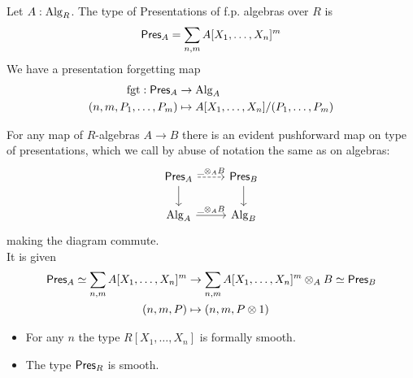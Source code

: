 \begin{definition}
	Let $A : \operatorname{Alg}_R$.
	 The type of Presentations of f.p. algebras over $R$ is 
	\[
	\mathsf{Pres}_A = \sum_{n,m} A[X_1,\hdots,X_n]^m
	\]
	We have a presentation forgetting map 
	\begin{align*}
		\mathrm{fgt} :\mathsf{Pres}_A &\to \operatorname{Alg}_A \\
		(n,m, P_1,\hdots,P_m) &\mapsto A[X_1,\hdots,X_n] / (P_1,\hdots,P_m)
	\end{align*}

	
\end{definition}
\begin{construction}
	For any map of $R$-algebras $A \to B$ there is an evident pushforward map on type of presentations, which we call by abuse of notation the same as on algebras:
	\[\begin{tikzcd}
		{\Pres_A} & {\Pres_B} \\
		{\Alg_A} & {\Alg_B}
		\arrow["\_ \otimes_A B",dashed, from=1-1, to=1-2]
		\arrow[from=1-1, to=2-1]
		\arrow[from=1-2, to=2-2]
		\arrow["{\_ \otimes_A B}", from=2-1, to=2-2]
	\end{tikzcd}\]
	making the diagram commute. \\
	It is given 
	\begin{align*}
		{\mathsf{Pres}_A} \simeq \sum_{n,m} A[X_1,\hdots,X_n]^m &\to \sum_{n,m} A[X_1,\hdots,X_n]^m \otimes_A B \simeq {\mathsf{Pres}_B} \\
		(n,m,P) &\mapsto (n,m,P\otimes 1)
	\end{align*}	
\end{construction}
\begin{lemma}{\label{lemma:PolyRingSmooth}}
	\begin{itemize}
		\item For any $n$ the type $R[X_1,\hdots,X_n]$ is formally smooth.
		\item The type $\mathsf{Pres}_R$ is smooth.
	\end{itemize}
\end{lemma}

